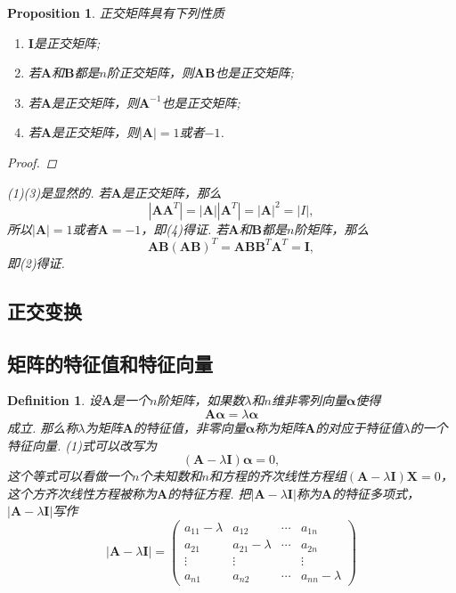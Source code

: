 \documentclass{article}
\newtheorem{proposition}[theorem]{Proposition}
\newtheorem{definition}[theorem]{Definition}
\newcommand{\mbf}[1]{\bm{#1}}
\begin{document}
\begin{proposition}
\rm 正交矩阵具有下列性质
\begin{enumerate}
	\item $\mbf{I}$是正交矩阵;
	\item 若$\mbf{A}$和$\mbf{B}$都是$n$阶正交矩阵，则$\mbf{A}\mbf{B}$也是正交矩阵;
	\item 若$\mbf{A}$是正交矩阵，则$\mbf{A}^{-1}$也是正交矩阵;
	\item 若$\mbf{A}$是正交矩阵，则$|\mbf{A}| = 1$或者$-1$.
\end{enumerate}
	
\begin{proof}

\end{proof}
(1)(3)是显然的. 若$\mbf{A}$是正交矩阵，那么
$$
|\mbf{A}\mbf{A}^T| =|\mbf{A}||\mbf{A}^T| = |\mbf{A}|^2 = |I|,
$$
所以$|\mbf{A}|=1$或者$\mbf{A}=-1$，即(4)得证. 若$\mbf{A}$和$\mbf{B}$都是$n$阶矩阵，那么
$$
\mbf{A}\mbf{B}(\mbf{A}\mbf{B})^T = \mbf{A}\mbf{B}\mbf{B}^T\mbf{A}^T = \mbf{I},
$$
即(2)得证. 
\end{proposition}

\subsection{正交变换}

\subsection{矩阵的特征值和特征向量}

\begin{definition}
\rm 设$\mbf{A}$是一个$n$阶矩阵，如果数$\lambda$和$n$维非零列向量$\mbf{\alpha}$使得
\begin{equation}
\mbf{A}\mbf{\alpha} = \lambda\mbf{\alpha}
\end{equation}
成立. 那么称$\lambda$为矩阵$\mbf{A}$的特征值，非零向量$\mbf{\alpha}$称为矩阵$\mbf{A}$的对应于特征值$\lambda$的一个特征向量. (1)式可以改写为
\begin{equation}
(\mbf{A}-\lambda\mbf{I})\mbf{\alpha} = 0,
\end{equation}
这个等式可以看做一个$n$个未知数和$n$和方程的齐次线性方程组$(\mbf{A}-\lambda\mbf{I})\mbf{X} = 0$，这个方齐次线性方程被称为$\mbf{A}$的特征方程. 把$|\mbf{A}-\lambda\mbf{I}|$称为$\mbf{A}$的特征多项式，$|\mbf{A}-\lambda\mbf{I}|$写作
$$
|\mbf{A}-\lambda\mbf{I}| = 
\begin{pmatrix}
a_{11} - \lambda & a_{12} & \cdots & a_{1n} \\
a_{21} & a_{21} - \lambda & \cdots & a_{2n} \\
\vdots & \vdots && \vdots \\
a_{n1} & a_{n2} & \cdots & a_{nn}-\lambda 
\end{pmatrix}
$$
\end{definition}
\end{document}

